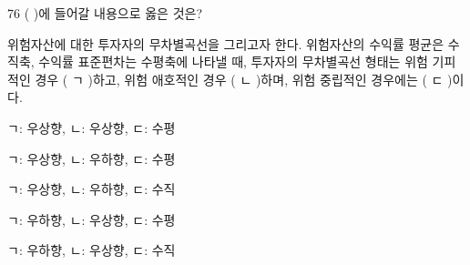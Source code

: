 \begin{question}{76}
( )에 들어갈 내용으로 옳은 것은?
\begin{framedtext}
위험자산에 대한 투자자의 무차별곡선을 그리고자 한다. 위험자산의 수익률 평균은 수직축, 수익률 표준편차는 수평축에 나타낼 때, 투자자의 무차별곡선 형태는 위험 기피적인 경우 ( ㄱ )하고, 위험 애호적인 경우 ( ㄴ )하며, 위험 중립적인 경우에는 ( ㄷ )이다. \par
\end{framedtext}
\begin{choices}
  \item ㄱ: 우상향, ㄴ: 우상향, ㄷ: 수평
  \item ㄱ: 우상향, ㄴ: 우하향, ㄷ: 수평
  \item ㄱ: 우상향, ㄴ: 우하향, ㄷ: 수직
  \item ㄱ: 우하향, ㄴ: 우상향, ㄷ: 수평
  \item ㄱ: 우하향, ㄴ: 우상향, ㄷ: 수직
\end{choices}
\end{question}
